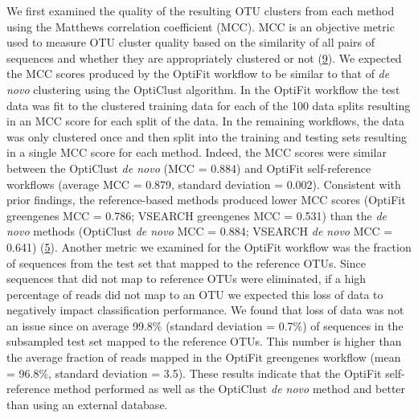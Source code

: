 \documentclass[
]{article}
\begin{document}
We first examined the quality of the resulting OTU clusters from each
method using the Matthews correlation coefficient (MCC). MCC is an
objective metric used to measure OTU cluster quality based on the
similarity of all pairs of sequences and whether they are appropriately
clustered or not (\protect\hyperlink{ref-westcott2015}{9}). We expected
the MCC scores produced by the OptiFit workflow to be similar to that of
\emph{de novo} clustering using the OptiClust algorithm. In the OptiFit
workflow the test data was fit to the clustered training data for each
of the 100 data splits resulting in an MCC score for each split of the
data. In the remaining workflows, the data was only clustered once and
then split into the training and testing sets resulting in a single MCC
score for each method. Indeed, the MCC scores were similar between the
OptiClust \emph{de novo} (MCC = 0.884) and OptiFit self-reference
workflows (average MCC = 0.879, standard deviation = 0.002). Consistent
with prior findings, the reference-based methods produced lower MCC
scores (OptiFit greengenes MCC = 0.786; VSEARCH greengenes MCC = 0.531)
than the \emph{de novo} methods (OptiClust \emph{de novo} MCC = 0.884;
VSEARCH \emph{de novo} MCC = 0.641)
(\protect\hyperlink{ref-sovacool2022}{5}). Another metric we examined
for the OptiFit workflow was the fraction of sequences from the test set
that mapped to the reference OTUs. Since sequences that did not map to
reference OTUs were eliminated, if a high percentage of reads did not
map to an OTU we expected this loss of data to negatively impact
classification performance. We found that loss of data was not an issue
since on average 99.8\% (standard deviation = 0.7\%) of sequences in the
subsampled test set mapped to the reference OTUs. This number is higher
than the average fraction of reads mapped in the OptiFit greengenes
workflow (mean = 96.8\%, standard deviation = 3.5). These results
indicate that the OptiFit self-reference method performed as well as the
OptiClust \emph{de novo} method and better than using an external
database.
\end{document}
